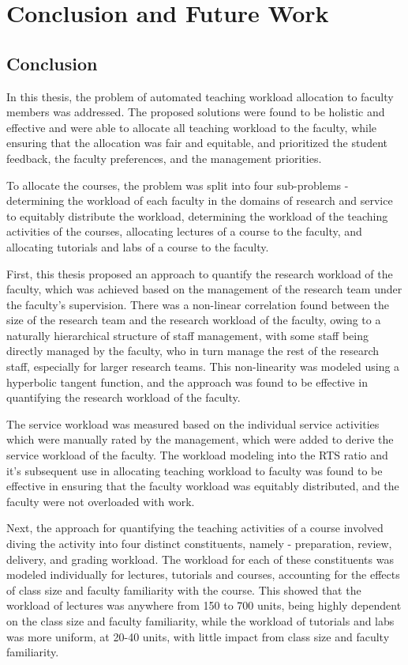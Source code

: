 \chapter{Conclusion and Future Work}

\section{Conclusion}

In this thesis, the problem of automated teaching workload allocation to faculty members was addressed. The proposed solutions were found to be holistic and effective and were able to allocate all teaching workload to the faculty, while ensuring that the allocation was fair and equitable, and prioritized the student feedback, the faculty preferences, and the management priorities.

To allocate the courses, the problem was split into four sub-problems - determining the workload of each faculty in the domains of research and service to equitably distribute the workload, determining the workload of the teaching activities of the courses, allocating lectures of a course to the faculty, and allocating tutorials and labs of a course to the faculty.

First, this thesis proposed an approach to quantify the research workload of the faculty, which was achieved based on the management of the research team under the faculty's supervision. There was a non-linear correlation found between the size of the research team and the research workload of the faculty, owing to a naturally hierarchical structure of staff management, with some staff being directly managed by the faculty, who in turn manage the rest of the research staff, especially for larger research teams. This non-linearity was modeled using a hyperbolic tangent function, and the approach was found to be effective in quantifying the research workload of the faculty.

The service workload was measured based on the individual service activities which were manually rated by the management, which were added to derive the service workload of the faculty. The workload modeling into the RTS ratio and it's subsequent use in allocating teaching workload to faculty was found to be effective in ensuring that the faculty workload was equitably distributed, and the faculty were not overloaded with work.

Next, the approach for quantifying the teaching activities of a course involved diving the activity into four distinct constituents, namely - preparation, review, delivery, and grading workload. The workload for each of these constituents was modeled individually for lectures, tutorials and courses, accounting for the effects of class size and faculty familiarity with the course. This showed that the workload of lectures was anywhere from 150 to 700 units, being highly dependent on the class size and faculty familiarity, while the workload of tutorials and labs was more uniform, at 20-40 units, with little impact from class size and faculty familiarity.

